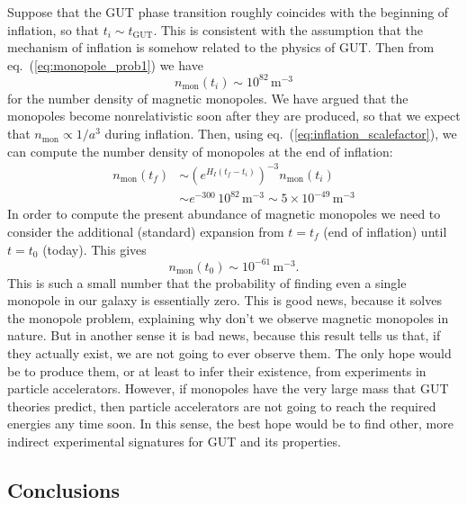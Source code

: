 Suppose that the GUT phase transition roughly coincides with the beginning of inflation, so that $t_i\sim t_{\mathrm{GUT}}$. This is consistent with the assumption that the mechanism of inflation is somehow related to the physics of GUT. Then from eq.\ (\ref{eq:monopole_prob1}) we have
\begin{equation}
n_{\mathrm{mon}}(t_i)\sim 10^{82}\,{\mathrm{m^{-3}}}
\end{equation}
for the number density of magnetic monopoles. We have argued that the monopoles become nonrelativistic soon after they are produced, so that we expect that $n_{\mathrm{mon}}\propto 1/a^3$ during inflation. Then, using eq.\ (\ref{eq:inflation_scalefactor}), we can compute the number density of monopoles at the end of inflation:
\begin{equation}
\begin{split}
n_{\mathrm{mon}}(t_f)&\sim \left(e^{H_I(t_f-t_i)}\right)^{-3}n_{\mathrm{mon}}(t_i)\\
&\sim e^{-300}\,10^{82}\,{\mathrm{m^{-3}}}\sim 5\times 10^{-49}\,{\mathrm{m^{-3}}}
\end{split}
\end{equation}
In order to compute the present abundance of magnetic monopoles we need to consider the additional (standard) expansion from $t=t_f$ (end of inflation) until $t=t_0$ (today). This gives
\begin{equation}
n_{\mathrm{mon}}(t_0)\sim 10^{-61}\,{\mathrm{m^{-3}}}.
\end{equation}
This is such a small number that the probability of finding even a single monopole in our galaxy is essentially zero. This is good news, because it solves the monopole problem, explaining why don't we observe magnetic monopoles in nature. But in another sense it is bad news, because this result tells us that, if they actually exist, we are not going to ever observe them. The only hope would be to produce them, or at least to infer their existence, from experiments in particle accelerators. However, if monopoles have the very large mass that GUT theories predict, then particle accelerators are not going to reach the required energies any time soon. In this sense, the best hope would be to find other, more indirect experimental signatures for GUT and its properties.

\subsection{Conclusions}

